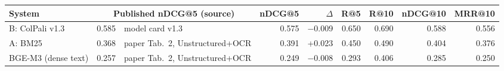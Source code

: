 \begin{adjustbox}{max width=\linewidth}
\begin{tabular}{lrlrrrrrr}
\toprule
System & \multicolumn{2}{c}{Published nDCG@5 (source)} & nDCG@5 & $\Delta$ & R@5 & R@10 & nDCG@10 & MRR@10 \\
\midrule
B: ColPali v1.3 & 0.585 & model card v1.3 & 0.575 & $-$0.009 & 0.650 & 0.690 & 0.588 & 0.556 \\
A: BM25 & 0.368 & paper Tab.~2, Unstructured+OCR & 0.391 & +0.023 & 0.450 & 0.490 & 0.404 & 0.376 \\
BGE-M3 (dense text) & 0.257 & paper Tab.~2, Unstructured+OCR & 0.249 & $-$0.008 & 0.293 & 0.406 & 0.285 & 0.250 \\
\bottomrule
\end{tabular}
\end{adjustbox}
\par{}
